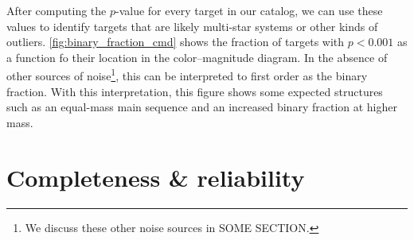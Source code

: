 \documentclass[modern, letterpaper]{aastex631}
\newcommand{\project}[1]{\textsl{#1}}
\newcommand{\Gaia}{\project{Gaia}}
\begin{document}

After computing the $p$-value for every target in our catalog, we can use these values to identify targets that are likely multi-star systems or other kinds of outliers.
\autoref{fig:binary_fraction_cmd} shows the fraction of targets with $p < 0.001$ as a function fo their location in the color--magnitude diagram.
In the absence of other sources of noise\footnote{We discuss these other noise sources in SOME SECTION.}, this can be interpreted to first order as the binary fraction.
With this interpretation, this figure shows some expected structures such as an equal-mass main sequence and an increased binary fraction at higher mass.


\section{Completeness \& reliability}
\end{document}
